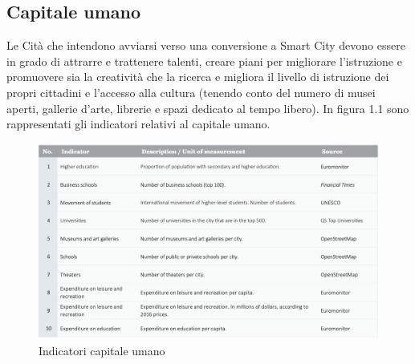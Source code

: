 \subsection{Capitale umano}
Le Cità che intendono avviarsi verso una conversione a Smart City devono essere in grado di attrarre e trattenere talenti, creare piani per migliorare l'istruzione e promuovere sia la creatività che la ricerca e migliora il livello di istruzione dei propri cittadini e l'accesso alla cultura (tenendo conto del numero di musei aperti, gallerie d'arte, librerie e spazi dedicato al tempo libero).
In figura 1.1 sono rappresentati gli indicatori relativi al capitale umano.
\begin{figure}[ht]
	\begin{center}
		\includegraphics[width=320bp]{img/indicatori_capitale_umano.png}
		\caption{Indicatori capitale umano}
	\end{center}
\end{figure}

